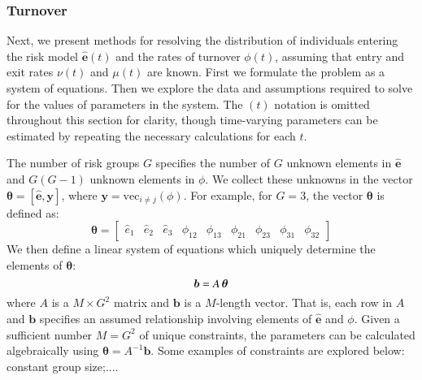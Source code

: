 \subsubsection{Turnover}\label{sss:params-turnover}
Next, we present methods for resolving
the distribution of individuals entering the risk model $\bm{\hat{e}}(t)$ and
the rates of turnover $\phi(t)$,
assuming that entry and exit rates $\nu(t)$ and $\mu(t)$ are known.
First we formulate the problem as a system of equations.
Then we explore the data and assumptions required			%
to solve for the values of parameters in the system.
The $(t)$ notation is omitted throughout this section for clarity,
though time-varying parameters can be estimated by
repeating the necessary calculations for each $t$.
\par
The number of risk groups $G$ specifies the number of 
$G$ unknown elements in $\bm{\hat{e}}$ and $G(G-1)$ unknown elements in $\phi$.
We collect these unknowns in the vector
$\bm{\theta} = \left[\bm{\hat{e}}, \bm{y}\right]$,
where $\bm{y} = \mathrm{vec}_{i \ne j}(\phi)$.
For example, for $G = 3$, the vector $\bm{\theta}$ is defined as:  %
\begin{equation}
\bm{\theta} = \left[
\begin{array}{ccccccccc}
\hat{e}_1 & \hat{e}_2 & \hat{e}_3 & \phi_{12} & \phi_{13} & \phi_{21} & \phi_{23} & \phi_{31} & \phi_{32}
\end{array}\right]
\end{equation}
We then define a linear system of equations		%
which uniquely determine the elements of $\bm{\theta}$:
\begin{equation}\label{eq:system-matrix}
\bm{b} = A \thinspace \bm{\theta}
\end{equation}  
where $A$ is a $M \times G^2 $ matrix
and $\bm{b}$ is a $M$-length vector.
That is, each row in $A$ and $\bm{b}$ specifies
an assumed relationship involving elements of
$\bm{\hat{e}}$ and $\phi$.							%
Given a sufficient number $M = G^2$ of unique constraints, %
the parameters can be calculated algebraically using $\bm{\theta} = A^{-1}\bm{b}$.
Some examples of constraints are explored below: constant group size;....  %

